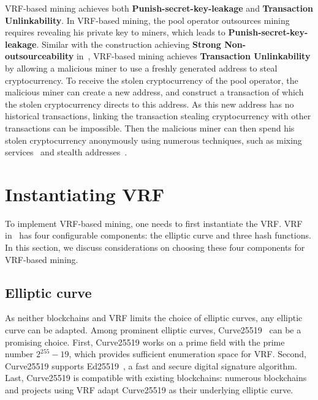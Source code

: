 \documentclass[sigconf]{acmart}
\begin{document}
VRF-based mining achieves both \textbf{Punish-secret-key-leakage} and \textbf{Transaction Unlinkability}.
In VRF-based mining, the pool operator outsources mining requires revealing his private key to miners, which leads to \textbf{Punish-secret-key-leakage}.
Similar with the construction achieving \textbf{Strong Non-outsourceability} in~\cite{miller2015nonoutsourceable}, VRF-based mining achieves \textbf{Transaction Unlinkability} by allowing a malicious miner to use a freshly generated address to steal cryptocurrency.
To receive the stolen cryptocurrency of the pool operator, the malicious miner can create a new address, and construct a transaction of which the stolen cryptocurrency directs to this address.
As this new address has no historical transactions, linking the transaction stealing cryptocurrency with other transactions can be impossible.
Then the malicious miner can then spend his stolen cryptocurrency anonymously using numerous techniques, such as mixing services~\cite{maxwell2013coinjoin}\cite{bonneau2014mixcoin}\cite{ruffing2014coinshuffle}\cite{heilman2017tumblebit} and stealth addresses~\cite{van2013cryptonote}.




\section{Instantiating VRF}
\label{sec:instantiation}

To implement VRF-based mining, one needs to first instantiate the VRF.
VRF in~\cite{goldberg2017draft} has four configurable components: the elliptic curve and three hash functions.
In this section, we discuss considerations on choosing these four components for VRF-based mining.

\subsection{Elliptic curve}

As neither blockchains and VRF limits the choice of elliptic curves, any elliptic curve can be adapted.
Among prominent elliptic curves, Curve25519~\cite{bernstein2006curve25519} can be a promising choice.
First, Curve25519 works on a prime field with the prime number $2^{255} - 19$, which provides sufficient enumeration space for VRF.
Second, Curve25519 supports Ed25519~\cite{bernstein2012high}, a fast and secure digital signature algorithm.
Last, Curve25519 is compatible with existing blockchains: numerous blockchains and projects using VRF adapt Curve25519 as their underlying elliptic curve.
\end{document}
